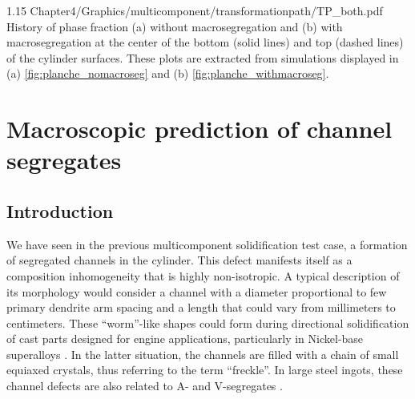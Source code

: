 \begin{landscape}
\begin{figureth}
{1.15}
{Chapter4/Graphics/multicomponent/transformationpath/TP_both.pdf}
{History of phase fraction (a) without macrosegregation and (b) with 
macrosegregation at the center of the bottom (solid lines) and top (dashed lines) 
of the cylinder surfaces.
These plots are extracted from simulations displayed in (a) \cref{fig:planche_nomacroseg}
and (b) \cref{fig:planche_withmacroseg}.}
\label{fig:tp_macroseg_influence}
\end{figureth}
\end{landscape}


\section{Macroscopic prediction of channel segregates}

\subsection{Introduction}  \label{sec:intro_freckle}

We have seen in the previous multicomponent solidification test case, a formation of segregated channels in the cylinder. 
This defect manifests itself as a composition inhomogeneity that is highly non-isotropic. A typical description of its 
morphology would consider a channel with a diameter proportional to few primary dendrite arm spacing and a length that 
could vary from millimeters to centimeters. These “worm”-like shapes could form during directional solidification of cast 
parts designed for engine applications, particularly in Nickel-base superalloys \citep{giamei_nature_1970,beckermann_development_2000,
genereux_characterization_2000,schneider_modeling_1997}. In the latter situation, the channels are filled with a chain of small equiaxed 
crystals, thus referring to the term “freckle”. In large steel ingots, these channel defects are also related to A- and V-segregates   
\citep{pickering_macrosegregation_2013}. 

